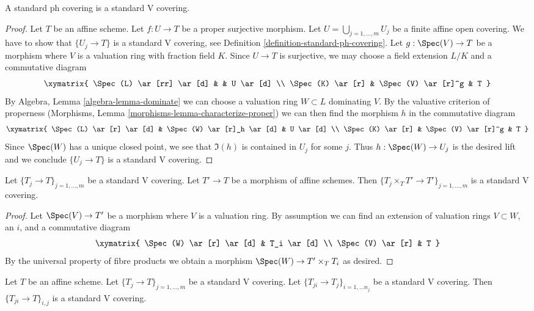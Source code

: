 \begin{lemma}
\label{lemma-standard-ph-standard-V}
A standard ph covering is a standard V covering.
\end{lemma}

\begin{proof}
Let $T$ be an affine scheme. Let $f : U \to T$ be a proper surjective
morphism. Let $U = \bigcup_{j = 1, \ldots, m} U_j$ be a finite
affine open covering. We have to show that $\{U_j \to T\}$
is a standard V covering, see
Definition \ref{definition-standard-ph-covering}.
Let $g : \Spec(V) \to T$
be a morphism where $V$ is a valuation ring with fraction field $K$.
Since $U \to T$ is surjective, we may choose a field extension
$L/K$ and a commutative diagram
$$
\xymatrix{
\Spec(L) \ar[rr] \ar[d] & & U \ar[d] \\
\Spec(K) \ar[r] & \Spec(V) \ar[r]^g & T
}
$$
By Algebra, Lemma \ref{algebra-lemma-dominate} we can choose a valuation ring
$W \subset L$ dominating $V$. By the valuative criterion of
properness (Morphisms, Lemma \ref{morphisms-lemma-characterize-proper})
we can then find the morphism $h$ in the commutative
diagram
$$
\xymatrix{
\Spec(L) \ar[r] \ar[d] & \Spec(W) \ar[r]_h \ar[d] & U \ar[d] \\
\Spec(K) \ar[r] & \Spec(V) \ar[r]^g & T
}
$$
Since $\Spec(W)$ has a unique closed point, we see that $\Im(h)$
is contained in $U_j$ for some $j$. Thus $h : \Spec(W) \to U_j$
is the desired lift and we conclude $\{U_j \to T\}$ is a standard V covering.
\end{proof}

\begin{lemma}
\label{lemma-base-change-standard-V}
Let $\{T_j \to T\}_{j = 1, \ldots, m}$ be a standard V covering.
Let $T' \to T$ be a morphism of affine schemes.
Then $\{T_j \times_T T' \to T'\}_{j = 1, \ldots, m}$ is a
standard V covering.
\end{lemma}

\begin{proof}
Let $\Spec(V) \to T'$ be a morphism where $V$ is a valuation ring.
By assumption we can find an extension of valuation rings $V \subset W$,
an $i$, and a commutative diagram
$$
\xymatrix{
\Spec(W) \ar[r] \ar[d] & T_i \ar[d] \\
\Spec(V) \ar[r] & T
}
$$
By the universal property of fibre products
we obtain a morphism $\Spec(W) \to T' \times_T T_i$
as desired.
\end{proof}

\begin{lemma}
\label{lemma-composition-standard-V}
Let $T$ be an affine scheme. Let $\{T_j \to T\}_{j = 1, \ldots, m}$
be a standard V covering. Let $\{T_{ji} \to T_j\}_{i = 1, \ldots n_j}$
be a standard V covering. Then $\{T_{ji} \to T\}_{i, j}$
is a standard V covering.
\end{lemma}

